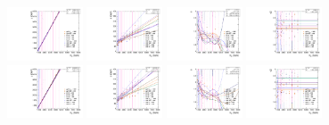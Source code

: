 \begin{figure}[htbp]
  \centering
  \includegraphics[width=0.2\textwidth]{fig/analysis/paramSignalShape_allSig_MVV_HP_bb_DEtaHi_MEAN.pdf}
  \includegraphics[width=0.2\textwidth]{fig/analysis/paramSignalShape_allSig_MVV_HP_bb_DEtaHi_SIGMA.pdf}
  \includegraphics[width=0.2\textwidth]{fig/analysis/paramSignalShape_allSig_MVV_HP_bb_DEtaHi_ALPHA1.pdf}
  \includegraphics[width=0.2\textwidth]{fig/analysis/paramSignalShape_allSig_MVV_HP_bb_DEtaHi_ALPHA2.pdf}\\
  \includegraphics[width=0.2\textwidth]{fig/analysis/paramSignalShape_allSig_MVV_LP_bb_DEtaHi_MEAN.pdf}
  \includegraphics[width=0.2\textwidth]{fig/analysis/paramSignalShape_allSig_MVV_LP_bb_DEtaHi_SIGMA.pdf}
  \includegraphics[width=0.2\textwidth]{fig/analysis/paramSignalShape_allSig_MVV_LP_bb_DEtaHi_ALPHA1.pdf}
  \includegraphics[width=0.2\textwidth]{fig/analysis/paramSignalShape_allSig_MVV_LP_bb_DEtaHi_ALPHA2.pdf}\\

\end{figure}
